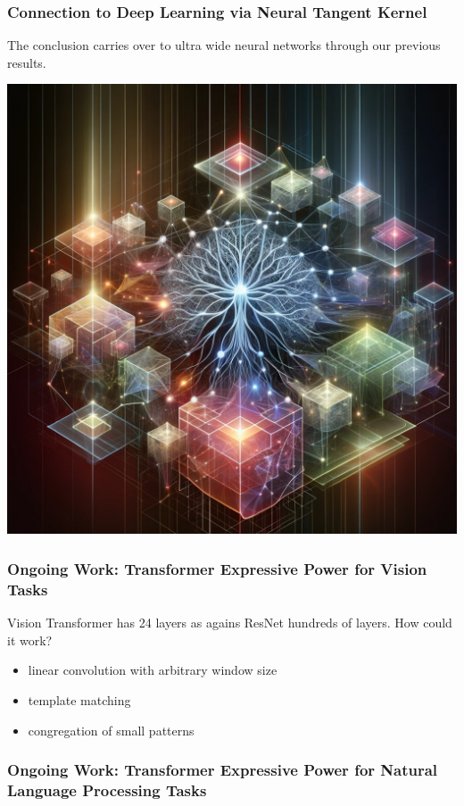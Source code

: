\documentclass{beamer}   	%
\theoremstyle{definition}
\begin{document}
\begin{frame}
\frametitle{Connection to Deep Learning via Neural Tangent Kernel}

The conclusion carries over to ultra wide neural networks through our previous results.
\begin{center}
\includegraphics[width=0.9\linewidth]{ntk.png}
\end{center}
\end{frame}

\begin{frame}
\frametitle{Ongoing Work: Transformer Expressive Power for Vision Tasks}
Vision Transformer has 24 layers as agains ResNet hundreds of layers. How could it work?
\begin{itemize}
	\item linear convolution with arbitrary window size
	\item template matching
	\item congregation of small patterns
\end{itemize}
\frametitle{Ongoing Work: Transformer Expressive Power for Natural Language Processing Tasks}
\end{frame}
\end{document}
